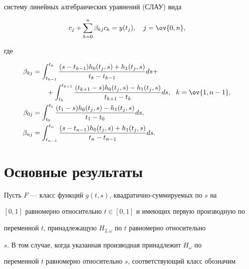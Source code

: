 систему линейных алгебраических уравнений (СЛАУ) вида 


\begin{equation} 


c_j+\sum^n_{k=0}\beta_{kj}c_k=y(t_j),\quad j=\ov{0,n}, 


\end{equation} 


где 


\begin{align} 


\beta_{kj}&=\int^{t_k}_{t_{k-1}} 


\frac{(s-t_{k-1})h_0(t_j,s)+h_1(t_j,s)}{t_k-t_{k-1}}ds+ \notag \\


&\qquad +\int^{t_{k+1}}_{t_k} 


\frac{(t_{k+1}-s)h_0(t_j,s)-h_1(t_j,s)}{t_{k+1}-t_k}ds, 


\ \ k=\ov{1,n-1},\\ 


% 


\beta_{0j}&=\int^{t_1}_{t_0} 


\frac{(t_1-s)h_0(t_j,s)-h_1(t_j,s)}{t_1-t_0}ds, \\ 


% 


\beta_{nj}&=\int^{t_n}_{t_{n-1}} 


\frac{(s-t_{n-1})h_0(t_j,s)+h_1(t_j,s)}{t_n-t_{n-1}}ds. 


\end{align} 


 


 


\section{Основные результаты} 


 


Пусть $F$ --- класс функций $g(t,s)$, квадратично-суммируемых по $s$ на 


$[0,1]$ равномерно относительно $t\in[0,1]$ и имеющих первую производную по 


переменной $t$, принадлежащую $H_{2,\omega}$ по $t$ равномерно относительно 


$s$. В том случае, когда указанная производная принадлежит $H_\omega$ по 


переменной $t$ равномерно относительно $s$, соответствующий класс обозначим 


